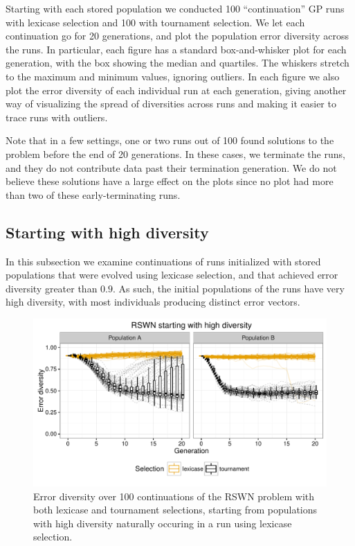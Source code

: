 \documentclass{sig-alternate-05-2015}
\begin{document}
Starting with each stored population we conducted 100 ``continuation'' GP runs with lexicase selection and 100 with tournament selection. We let each continuation go for 20 generations, and plot the population error diversity across the runs. In particular, each figure has a standard box-and-whisker plot for each generation, with the box showing the median and quartiles. The whiskers stretch to the maximum and minimum values, ignoring outliers. In each figure we also plot the error diversity of each individual run at each generation, giving another way of visualizing the spread of diversities across runs and making it easier to trace runs with outliers.

Note that in a few settings, one or two runs out of 100 found solutions to the problem before the end of 20 generations. In these cases, we terminate the runs, and they do not contribute data past their termination generation. We do not believe these solutions have a large effect on the plots since no plot had more than two of these early-terminating runs.



\subsection{Starting with high diversity}
\label{sec:highDiversityResults}

In this subsection we examine continuations of runs initialized with stored populations that were evolved using lexicase selection, and that achieved error diversity greater than $0.9$. As such, the initial populations of the runs have very high diversity, with most individuals producing distinct error vectors.

\begin{figure}
	\includegraphics{../figures/RSWN_high_diversity}
	\vspace{-1 cm}
	\caption{Error diversity over 100 continuations of the RSWN problem with both lexicase and tournament selections, starting from populations with high diversity naturally occuring in a run using lexicase selection.}
	\label{fig:RSWNhighDiversity}
\end{figure}
\end{document}
